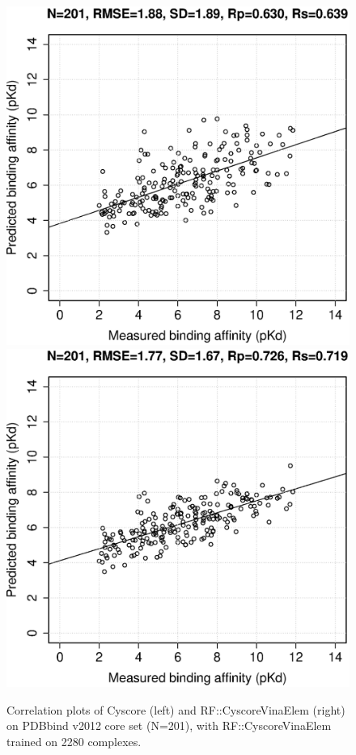 \documentclass[journal=jacsat,manuscript=article]{achemso}
\begin{document}
\begin{figure}[ht!]
\includegraphics[width=\linewidth]{../rfcyscore/x4/mlr/trn-247-tst-201-yp.eps}
\endminipage
{}
\includegraphics[width=\linewidth]{../rfcyscore/x46/rf/trn-2280-tst-201-yp.eps}
\endminipage
\caption{Correlation plots of Cyscore (left) and RF::CyscoreVinaElem (right) on PDBbind v2012 core set (N=201), with RF::CyscoreVinaElem trained on 2280 complexes.}
\label{fig:tst201}
\end{figure}
\end{document}
